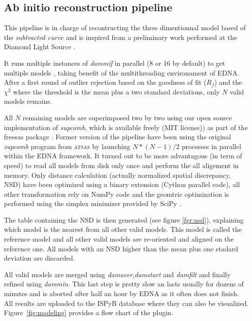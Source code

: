 \documentclass[preprint,pdf]{iucr}              %
\begin{document}
\subsection{Ab initio reconstruction pipeline}
\label{abinitio}
This pipeline is in charge of recontructing the three dimentionnal model based
of the \textit{subtracted curve} and is inspired from a preliminary work
performed at the Diamond Light Source \cite{sas_piepline}.

It runs multiple instances of \textit{dammif} in parallel (8 or 16 by default)
to get multiple models \cite{dammif}, taking benefit of the multithreading
environament of EDNA.
After a first round of outlier rejection based on the goodness of fit ($R_{f}$)
and the $\chi^{2}$  where the threshold is the mean plus a two standard
deviations, only $N$ valid models remains.

All $N$ remaining models are superimposed two by two using
our open source implementation of \textit{supcomb}, which is available freely
(MIT license)) as part of the freesas package \cite{freesas}.  
Former version of the pipeline have been using the original 
\textit{supcomb} \cite{supcomb} program from \textsc{atsas} by launching
$N*(N-1)/2$ processes in parallel within the EDNA framework. 
It turned out to be
more advantagous (in term of speed) to read all models from disk only once and
perform the all aligement in memory. 
Only distance calculation (actually normalized spatial discrepancy, NSD) have
been optimized using a binary extension (Cython parallel code), all other
transformation rely on NumPy \cite{numpy} code and the geomtric optimization is
performed using the simplex minimizer provided by SciPy \cite{scipy}.

The table containing the NSD is then generated
(see figure \ref{fgr:nsd}), explaining which model is the nearest from all other
valid models. This model is called the reference model and all other valid
models are re-oriented and aligned on the reference one. 
All models with an NSD higher than the mean plus one stadard deviation are
discarded.

All valid models are merged using \textit{damaver}\cite{damaver},\textit{damstart} and
\textit{damfilt} and finally refined using \textit{dammin}\cite{dammin}.
This last step is pretty slow an lasts usually for dozens of minutes and is
aborted after half an hour by EDNA as it often does not finish. 
All results are uploaded to the ISPyB database where they can also be
visualized. Figure~\ref{fig:modeling} provides a flow chart of the plugin.
\end{document}
